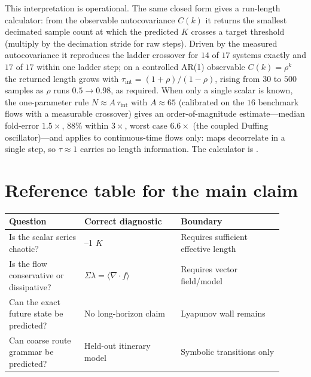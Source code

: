 \documentclass[11pt]{article}
\begin{document}
This interpretation is operational. The same closed form gives a run-length
calculator: from the observable autocovariance $C(k)$ it returns the smallest
decimated sample count at which the predicted $K$ crosses a target threshold
(multiply by the decimation stride for raw steps). Driven by the measured
autocovariance it reproduces the ladder crossover for $14$ of $17$ systems
exactly and $17$ of $17$ within one ladder step; on a controlled AR(1) observable
$C(k)=\rho^k$ the returned length grows with
$\tau_{\mathrm{int}}=(1+\rho)/(1-\rho)$, rising from $30$ to $500$ samples as
$\rho$ runs $0.5\to0.98$, as required. When only a single scalar is
known, the one-parameter rule $N\approx A\,\tau_{\mathrm{int}}$ with $A\approx65$
(calibrated on the $16$ benchmark flows with a measurable crossover) gives an
order-of-magnitude estimate---median fold-error $1.5\times$, $88\%$ within
$3\times$, worst case $6.6\times$ (the coupled Duffing oscillator)---and applies
to continuous-time flows only: maps decorrelate in a single step, so
$\tau\approx1$ carries no length information. The calculator is
.

\section{Reference table for the main claim}

\begin{center}
\small
\begin{tabular}{>{\raggedright\arraybackslash}p{0.25\linewidth}>{\raggedright\arraybackslash}p{0.32\linewidth}>{\raggedright\arraybackslash}p{0.34\linewidth}}
\toprule
Question & Correct diagnostic & Boundary \\
\midrule
Is the scalar series chaotic? & 0--1 $K$ & Requires sufficient effective length \\
Is the flow conservative or dissipative? & $\Sigma\lambda=\langle\nabla\!\cdot f\rangle$ & Requires vector field/model \\
Can the exact future state be predicted? & No long-horizon claim & Lyapunov wall remains \\
Can coarse route grammar be predicted? & Held-out itinerary model & Symbolic transitions only \\
\bottomrule
\end{tabular}
\end{center}
\end{document}
